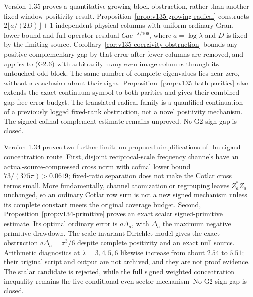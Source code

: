 \documentclass[11pt]{article}
\theoremstyle{remark}
\begin{document}
Version 1.35 proves a quantitative growing-block obstruction, rather
than another fixed-window positivity result.  Proposition~\ref{prop:v135-growing-radical}
constructs $2\lfloor a/(2D)\rfloor+1$ independent physical columns with
uniform ordinary Gram lower bound and full operator residual
$Ca e^{-\lambda/100}$, where $a=\log\lambda$ and $D$ is fixed by the
limiting source.  Corollary~\ref{cor:v135-coercivity-obstruction} bounds
any positive complementary gap by that error after fewer columns are
removed, and applies to (G2.6) with arbitrarily many even image columns
through its untouched odd block.  The same number of complete eigenvalues
lies near zero, without a conclusion about their signs.
Proposition~\ref{prop:v135-both-parities} also extends the exact continuum
symbol to both parities and gives their combined gap-free error budget.
The translated radical family is a quantified continuation of a previously
logged fixed-rank obstruction, not a novel positivity mechanism.  The
signed cofinal complement estimate remains unproved. No G2 sign gap is closed.

Version 1.34 proves two further limits on proposed simplifications of
the signed concentration route.  First, disjoint reciprocal-scale
frequency channels have an actual-source-compressed cross norm with
cofinal lower bound $73/(375\pi)>0.0619$; fixed-ratio separation does
not make the Cotlar cross terms small.  More fundamentally, channel
atomization or regrouping leaves $Z_a^*Z_a$ unchanged, so an ordinary
Cotlar row sum is not a new signed mechanism unless its complete
constant meets the original coverage budget.  Second,
Proposition~\ref{prop:v134-primitive} proves an exact scalar
signed-primitive estimate.  Its optimal ordinary error is
$a\Delta_a$, with $\Delta_a$ the maximum negative primitive drawdown.
The scale-invariant Dirichlet model gives the exact obstruction
$a\Delta_a=\pi^3/6$ despite complete positivity and an exact null
source.  Arithmetic diagnostics at $\lambda=3,4,5,6$ likewise increase
from about $2.54$ to $5.51$; their original script and output are not
archived, and they are not proof evidence.  The scalar
candidate is rejected, while the full signed weighted concentration
inequality remains the live conditional even-sector mechanism.  No G2
sign gap is closed.
\end{document}
